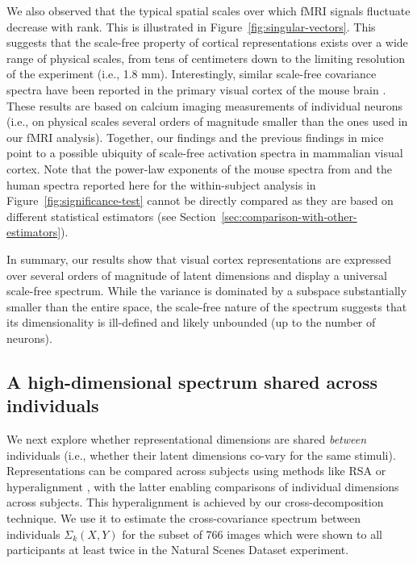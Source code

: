 \documentclass[10pt]{article}
\begin{document}
We also observed that the typical spatial scales over which fMRI signals fluctuate decrease with rank. This is illustrated in Figure~\ref{fig:singular-vectors}. This suggests that the scale-free property of cortical representations exists over a wide range of physical scales, from tens of centimeters down to the limiting resolution of the experiment (i.e., 1.8 mm). Interestingly, similar scale-free covariance spectra have been reported in the primary visual cortex of the mouse brain \autocite{Stringer2019}. These results are based on calcium imaging measurements of individual neurons (i.e., on physical scales several orders of magnitude smaller than the ones used in our fMRI analysis). Together, our findings and the previous findings in mice point to a possible ubiquity of scale-free activation spectra in mammalian visual cortex. Note that the power-law exponents of the mouse spectra from \textcite{Stringer2019} and the human spectra reported here for the within-subject analysis in Figure~\ref{fig:significance-test} cannot be directly compared as they are based on different statistical estimators (see Section~\ref{sec:comparison-with-other-estimators}).

In summary, our results show that visual cortex representations are expressed over several orders of magnitude of latent dimensions and display a universal scale-free spectrum. While the variance is dominated by a subspace substantially smaller than the entire space, the scale-free nature of the spectrum suggests that its dimensionality is ill-defined and likely unbounded (up to the number of neurons).

\subsection{A high-dimensional spectrum shared across individuals}\label{a-high-dimensional-spectrum-shared-across-individuals}

We next explore whether representational dimensions are shared \emph{between} individuals (i.e., whether their latent dimensions co-vary for the same stimuli). Representations can be compared across subjects using methods like RSA \autocite{Kriegeskorte2008} or hyperalignment \autocite{Haxby2011}, with the latter enabling comparisons of individual dimensions across subjects. This hyperalignment is achieved by our cross-decomposition technique. We use it to estimate the cross-covariance spectrum between individuals \(\Sigma_k(X, Y)\) for the subset of 766 images which were shown to all participants at least twice in the Natural Scenes Dataset experiment.
\end{document}
